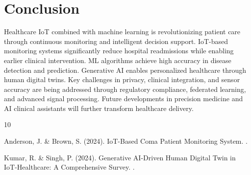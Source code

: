 \documentclass[12pt,a4paper]{article}
\begin{document}
\section{Conclusion}

Healthcare IoT combined with machine learning is revolutionizing patient care through continuous monitoring and intelligent decision support. IoT-based monitoring systems significantly reduce hospital readmissions while enabling earlier clinical intervention. ML algorithms achieve high accuracy in disease detection and prediction. Generative AI enables personalized healthcare through human digital twins. Key challenges in privacy, clinical integration, and sensor accuracy are being addressed through regulatory compliance, federated learning, and advanced signal processing. Future developments in precision medicine and AI clinical assistants will further transform healthcare delivery.


\begin{thebibliography}{10}

Anderson, J. \& Brown, S. (2024).
\newblock IoT-Based Coma Patient Monitoring System.
.

Kumar, R. \& Singh, P. (2024).
\newblock Generative AI-Driven Human Digital Twin in IoT-Healthcare: A Comprehensive Survey.
.

\end{thebibliography}
\end{document}
